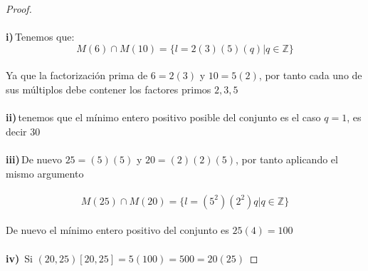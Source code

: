 \documentclass[11pt,letterpaper]{article}
\newcommand{\Z}{\mathbb{Z}}
\begin{document}
\begin{proof}\,\\
    \,\\
    \textbf{i)}\,Tenemos que:\,\\
    \begin{equation*}
        M(6)\cap M(10)=\{l=2(3)(5)(q)|q\in \Z\}
    \end{equation*}\,\\
    Ya que la factorizaci\'on prima de $6=2(3)$ y $10=5(2)$, por tanto cada uno de 
    sus m\'ultiplos debe contener los factores primos $2,3,5$\,\\
    \,\\
    \textbf{ii)}\,tenemos que el m\'inimo entero positivo posible del conjunto es el caso $q=1$, es decir $30$\,\\
    \,\\
    \textbf{iii)}\,De nuevo $25=(5)(5)$ y $20=(2)(2)(5)$, por tanto aplicando el mismo argumento\,\\
    \,\\
    \begin{equation*}
        M(25)\cap M(20)=\{l=(5^2)(2^2)q|q\in \Z\}
    \end{equation*}\,\\
    De nuevo el m\'inimo entero positivo del conjunto es $25(4)=100$\,\\
    \,\\
    \textbf{iv)}\, Si $(20,25)[20,25]=5(100)=500=20(25)$
\end{proof}
\newpage
{}\,\\
\end{document}
